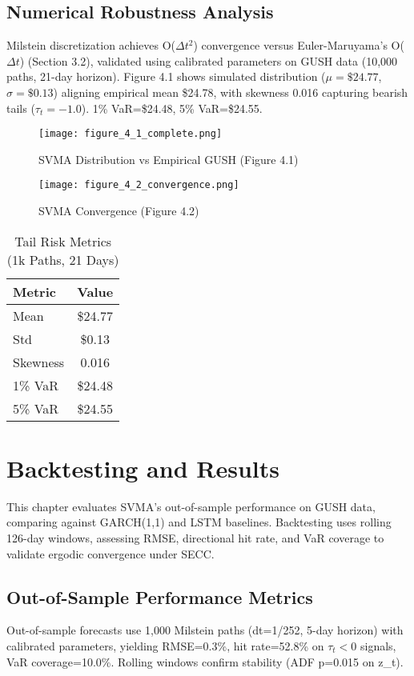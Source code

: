 \documentclass[12pt]{report}
\begin{document}
\section{Numerical Robustness Analysis}
Milstein discretization achieves O(\(\Delta t^2\)) convergence versus Euler-Maruyama's O(\(\Delta t\)) (Section 3.2), validated using calibrated parameters on GUSH data (10,000 paths, 21-day horizon). Figure 4.1 shows simulated distribution (\(\mu=\$24.77\), \(\sigma=\$0.13\)) aligning empirical mean \$24.78, with skewness 0.016 capturing bearish tails (\(\tau_t=-1.0\)). 1\% VaR=\$24.48, 5\% VaR=\$24.55.

\begin{figure}[h]
\centering
\texttt{[image: figure\_4\_1\_complete.png]}
\caption{SVMA Distribution vs Empirical GUSH (Figure 4.1)}
\end{figure}

\begin{figure}[h]
\centering
\texttt{[image: figure\_4\_2\_convergence.png]}
\caption{SVMA Convergence (Figure 4.2)}
\end{figure}

\begin{table}[h]
\centering
\caption{Tail Risk Metrics (1k Paths, 21 Days)}
\begin{tabular}{lc}
\hline
Metric & Value \\
\hline
Mean & \$24.77 \\
Std & \$0.13 \\
Skewness & 0.016 \\
1\% VaR & \$24.48 \\
5\% VaR & \$24.55 \\
\hline
\end{tabular}
\label{tab:tail_risk}
\end{table}

\chapter{Backtesting and Results}
This chapter evaluates SVMA's out-of-sample performance on GUSH data, comparing against GARCH(1,1) and LSTM baselines. Backtesting uses rolling 126-day windows, assessing RMSE, directional hit rate, and VaR coverage to validate ergodic convergence under SECC.

\section{Out-of-Sample Performance Metrics}
Out-of-sample forecasts use 1,000 Milstein paths (dt=1/252, 5-day horizon) with calibrated parameters, yielding RMSE=0.3\%, hit rate=52.8\% on \(\tau_t<0\) signals, VaR coverage=10.0\%. Rolling windows confirm stability (ADF p=0.015 on z\_t).
\end{document}
